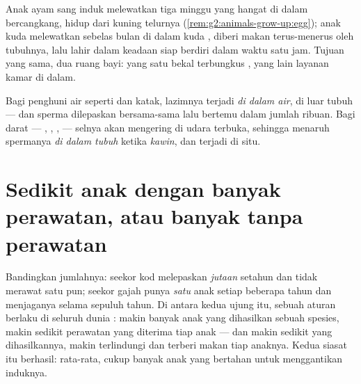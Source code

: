 \begin{example}\label{ex:g4:animal-reproduction:nurseries}
Anak ayam sang induk melewatkan tiga minggu yang hangat di dalam 
bercangkang, hidup dari kuning telurnya
(\cref{rem:g2:animals-grow-up:egg}); anak kuda melewatkan sebelas
bulan di dalam kuda , diberi makan terus-menerus oleh
tubuhnya, lalu lahir dalam keadaan siap berdiri dalam waktu satu jam.
Tujuan yang sama, dua ruang bayi: yang satu bekal terbungkus ,
yang lain layanan kamar di dalam.
\end{example}

\begin{proposition}\label{prop:g4:animal-reproduction:where}
Bagi penghuni air seperti  dan katak,  lazimnya terjadi
\emph{di dalam air}, di luar tubuh  ---  dan sperma
dilepaskan bersama-sama lalu bertemu dalam jumlah ribuan. Bagi 
darat --- , , ,  --- selnya akan mengering
di udara terbuka, sehingga  menaruh spermanya \emph{di dalam
tubuh } ketika \emph{kawin}, dan 
terjadi di situ.
\end{proposition}
\admitted

\section{Sedikit anak dengan banyak perawatan, atau banyak tanpa perawatan}

\begin{proposition}\label{prop:g4:animal-reproduction:strategies}
Bandingkan jumlahnya: seekor  kod melepaskan \emph{jutaan} 
setahun dan tidak merawat satu pun; seekor gajah punya \emph{satu}
anak setiap beberapa tahun dan menjaganya selama sepuluh tahun. Di
antara kedua ujung itu, sebuah aturan berlaku di seluruh dunia :
makin banyak anak yang dihasilkan sebuah spesies, makin sedikit
perawatan yang diterima tiap anak --- dan makin sedikit yang
dihasilkannya, makin terlindungi dan terberi makan tiap anaknya. Kedua
siasat itu berhasil: rata-rata, cukup banyak anak yang bertahan untuk
menggantikan induknya.
\end{proposition}
\admitted

